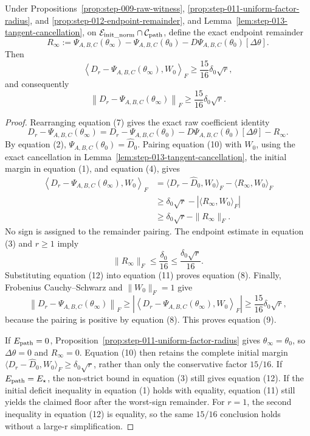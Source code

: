 \begin{proposition}
\label{prop:step-013-preserved-raw-margin}
Under Propositions~\ref{prop:step-009-raw-witness},
\ref{prop:step-011-uniform-factor-radius}, and
\ref{prop:step-012-endpoint-remainder}, and
Lemma~\ref{lem:step-013-tangent-cancellation}, on
\(\mathcal E_{\rm init\_norm}\cap\mathcal C_{\rm path}\), define the exact
endpoint remainder
\[
  R_\infty:=\Psi_{A,B,C}(\theta_\infty)-\Psi_{A,B,C}(\theta_0)
  -D\Psi_{A,B,C}(\theta_0)[\Delta\theta].                \tag{7}
\]
Then
\[
  \left\langle D_r-\Psi_{A,B,C}(\theta_\infty),W_0\right\rangle_F
  \ge\frac{15}{16}\delta_0\sqrt r,                      \tag{8}
\]
and consequently
\[
  \left\|D_r-\Psi_{A,B,C}(\theta_\infty)\right\|_F
  \ge\frac{15}{16}\delta_0\sqrt r.                      \tag{9}
\]

\end{proposition}

\begin{proof}
Rearranging equation (7) gives the exact raw
coefficient identity
\[
  D_r-\Psi_{A,B,C}(\theta_\infty)
  =D_r-\Psi_{A,B,C}(\theta_0)
   -D\Psi_{A,B,C}(\theta_0)[\Delta\theta]-R_\infty.
  \tag{10}
\]
By equation (2), \(\Psi_{A,B,C}(\theta_0)=\widehat D_0\). Pairing equation
(10) with \(W_0\), using the exact cancellation in
Lemma~\ref{lem:step-013-tangent-cancellation}, the initial margin in equation
(1), and equation (4), gives
\[
\begin{aligned}
  \left\langle D_r-\Psi_{A,B,C}(\theta_\infty),W_0\right\rangle_F
  &=\langle D_r-\widehat D_0,W_0\rangle_F
    -\langle R_\infty,W_0\rangle_F\\
  &\ge\delta_0\sqrt r-|\langle R_\infty,W_0\rangle_F|\\
  &\ge\delta_0\sqrt r-\|R_\infty\|_F.
\end{aligned}\tag{11}
\]
No sign is assigned to the remainder pairing. The endpoint estimate
in equation (3) and \(r\ge1\) imply
\[
  \|R_\infty\|_F
  \le\frac{\delta_0}{16}
  \le\frac{\delta_0\sqrt r}{16}.                        \tag{12}
\]
Substituting equation (12) into equation (11) proves equation (8). Finally,
Frobenius Cauchy--Schwarz and \(\|W_0\|_F=1\) give
\[
  \left\|D_r-\Psi_{A,B,C}(\theta_\infty)\right\|_F
  \ge
  \left|\left\langle
    D_r-\Psi_{A,B,C}(\theta_\infty),W_0
  \right\rangle_F\right|
  \ge\frac{15}{16}\delta_0\sqrt r,
\]
because the pairing is positive by equation (8). This proves equation (9).

If \(E_{\rm path}=0\), Proposition~\ref{prop:step-011-uniform-factor-radius} gives
\(\theta_\infty=\theta_0\), so \(\Delta\theta=0\) and
\(R_\infty=0\). Equation (10) then retains the complete initial margin
\(\langle D_r-\widehat D_0,W_0\rangle_F\ge\delta_0\sqrt r\), rather than
only the conservative factor \(15/16\). If \(E_{\rm path}=E_\star\), the
non-strict bound in equation (3) still gives equation (12). If the
initial deficit inequality in equation (1) holds with equality, equation
(11) still yields the claimed floor after the worst-sign remainder. For
\(r=1\), the second inequality in equation (12) is equality, so the same
\(15/16\) conclusion holds without a large-r simplification. 

\end{proof}

